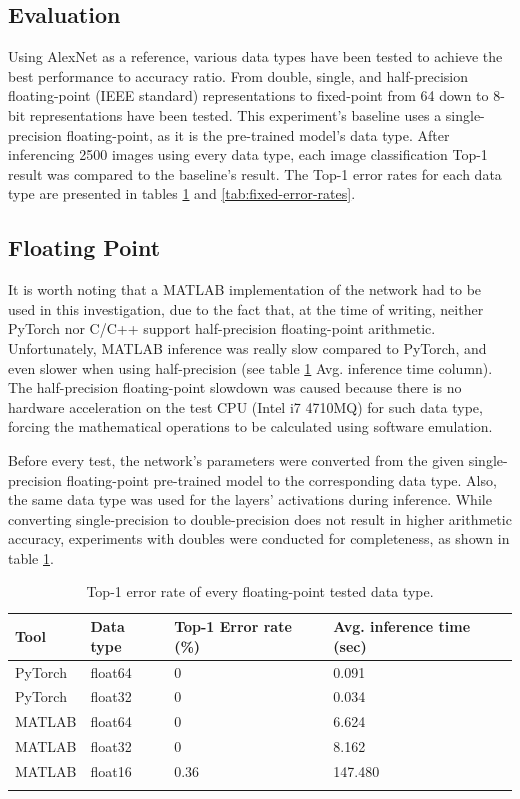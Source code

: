 \subsection{Evaluation}
Using AlexNet as a reference, various data types have been tested to achieve the best performance to accuracy ratio. From double, single, and half-precision floating-point (IEEE standard) representations to fixed-point from 64 down to 8-bit representations have been tested. This experiment's baseline uses a single-precision floating-point, as it is the pre-trained model's data type. After inferencing 2500 images using every data type, each image classification Top-1 result was compared to the baseline's result. The Top-1 error rates for each data type are presented in tables \ref{tab:floats-error-rates} and \ref{tab:fixed-error-rates}.

\subsection{Floating Point}
It is worth noting that a MATLAB implementation of the network had to be used in this investigation, due to the fact that, at the time of writing, neither PyTorch nor C/C++ support half-precision floating-point arithmetic. Unfortunately, MATLAB inference was really slow compared to PyTorch, and even slower when using half-precision (see table \ref{tab:floats-error-rates} Avg. inference time column). The half-precision floating-point slowdown was caused because there is no hardware acceleration on the test CPU (Intel i7 4710MQ) for such data type, forcing the mathematical operations to be calculated using software emulation.

Before every test, the network's parameters were converted from the given single-precision floating-point pre-trained model to the corresponding data type. Also, the same data type was used for the layers' activations during inference. While converting single-precision to double-precision does not result in higher arithmetic accuracy, experiments with doubles were conducted for completeness, as shown in table \ref{tab:floats-error-rates}.

\begin{table}[H]
	\caption{Top-1 error rate of every floating-point tested data type.}
	\label{tab:floats-error-rates}
	\centering
	\begin{tabular}{p{2cm} p{2cm} p{3cm} p{3cm}}
		\toprule
		\textbf{Tool} & \textbf{Data type} & \textbf{Top-1 Error rate (\%)} & \textbf{Avg. inference time (sec)} \\
		\midrule
			PyTorch & float64	& 0			& 0.091 \\
			PyTorch & float32	& 0			& 0.034 \\
			MATLAB 	& float64	& 0			& 6.624 \\
			MATLAB 	& float32	& 0			& 8.162 \\
			MATLAB 	& float16 	& 0.36  	& 147.480 \\
		\bottomrule\\
	\end{tabular}
\end{table}

